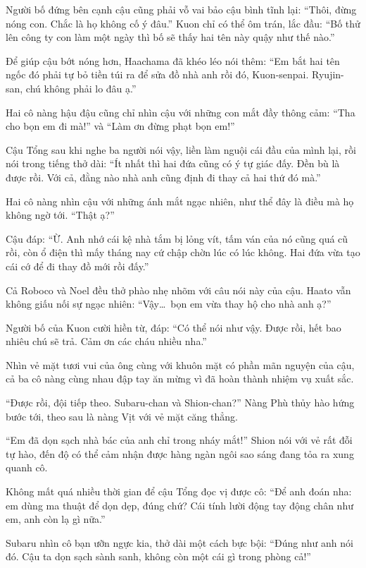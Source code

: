 \documentclass[../main.tex]{subfiles}
\begin{document}
Người bố đứng bên cạnh cậu cũng phải vỗ vai bảo cậu bình tĩnh lại: ``Thôi, đừng nóng con. Chắc là họ không cố ý đâu.'' Kuon chỉ có thể ôm trán, lắc đầu: ``Bố thử lên công ty con làm một ngày thì bố sẽ thấy hai tên này quậy như thế nào.''

Để giúp cậu bớt nóng hơn, Haachama đã khéo léo nói thêm: ``Em bắt hai tên ngốc đó phải tự bỏ tiền túi ra để sửa đồ nhà anh rồi đó, Kuon-senpai. Ryujin-san, chú không phải lo đâu ạ.''

Hai cô nàng hậu đậu cũng chỉ nhìn cậu với những con mắt đầy thông cảm: ``Tha cho bọn em đi mà!'' và ``Làm ơn đừng phạt bọn em!''

Cậu Tổng sau khi nghe ba người nói vậy, liền làm nguội cái đầu của mình lại, rồi nói trong tiếng thở dài: ``Ít nhất thì hai đứa cũng có ý tự giác đấy. Đền bù là được rồi. Với cả, đằng nào nhà anh cũng định đi thay cả hai thứ đó mà.''

Hai cô nàng nhìn cậu với những ánh mắt ngạc nhiên, như thể đây là điều mà họ không ngờ tới. ``Thật ạ?''

Cậu đáp: ``Ừ. Anh nhớ cái kệ nhà tắm bị lỏng vít, tấm ván của nó cũng quá cũ rồi, còn ổ điện thì mấy tháng nay cứ chập chờn lúc có lúc không. Hai đứa vừa tạo cái cớ để đi thay đồ mới rồi đấy.''

Cả Roboco và Noel đều thở phào nhẹ nhõm với câu nói này của cậu. Haato vẫn không giấu nối sự ngạc nhiên: ``Vậy\dots\ bọn em vừa thay hộ cho nhà anh ạ?''

Người bố của Kuon cười hiền từ, đáp: ``Có thể nói như vậy. Được rồi, hết bao nhiêu chú sẽ trả. Cảm ơn các cháu nhiều nha.''

Nhìn vẻ mặt tươi vui của ông cùng với khuôn mặt có phần mãn nguyện của cậu, cả ba cô nàng cùng nhau đập tay ăn mừng vì đã hoàn thành nhiệm vụ xuất sắc.

``Được rồi, đội tiếp theo. Subaru-chan và Shion-chan?'' Nàng Phù thủy hào hứng bước tới, theo sau là nàng Vịt với vẻ mặt căng thẳng.

``Em đã dọn sạch nhà bác của anh chỉ trong nháy mắt!'' Shion nói với vẻ rất đỗi tự hào, đến độ có thể cảm nhận được hàng ngàn ngôi sao sáng đang tỏa ra xung quanh cô.

Không mất quá nhiều thời gian để cậu Tổng đọc vị được cô: ``Để anh đoán nha: em dùng ma thuật để dọn dẹp, đúng chứ? Cái tính lười động tay động chân như em, anh còn lạ gì nữa.''

Subaru nhìn cô bạn ưỡn ngực kia, thở dài một cách bực bội: ``Đúng như anh nói đó. Cậu ta dọn sạch sành sanh, không còn một cái gì trong phòng cả!''
\end{document}
